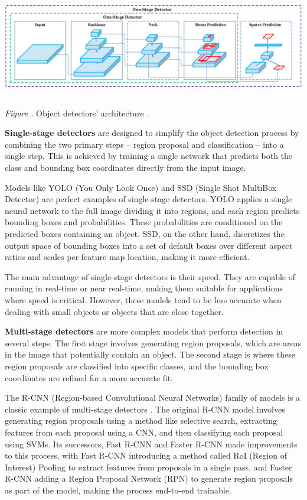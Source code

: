 \documentclass[14pt,a4paper]{extarticle}
\newcounter{e}
\newcounter{pic}
\newcommand{\pic}[1]{\refstepcounter{pic} \vspace{-0.3cm}\textit{Figure \arabic{pic}\label{#1}.}}
\newcounter{tabl}
\numberwithin{equation}{section}
\numberwithin{figure}{section}
\begin{document}
\begin{center}
    \includegraphics[height=4.5cm]{images/architecture.png}
\end{center}
\begin{center}
    \pic{yolov4-architecture} Object detectors' architecture \cite{yolov4-paper}.
\end{center}

\textbf{Single-stage detectors} are designed to simplify the object detection process by combining the two primary steps -- region proposal and classification -- into a single step. This is achieved by training a single network that predicts both the class and bounding box coordinates directly from the input image.

Models like YOLO (You Only Look Once) and SSD (Single Shot MultiBox Detector) \cite{ssd} are perfect examples of single-stage detectors. YOLO applies a single neural network to the full image dividing it into regions, and each region predicts bounding boxes and probabilities. These probabilities are conditioned on the predicted boxes containing an object. SSD, on the other hand, discretizes the output space of bounding boxes into a set of default boxes over different aspect ratios and scales per feature map location, making it more efficient.

The main advantage of single-stage detectors is their speed. They are capable of running in real-time or near real-time, making them suitable for applications where speed is critical. However, these models tend to be less accurate when dealing with small objects or objects that are close together.

\textbf{Multi-stage detectors} are more complex models that perform detection in several steps. The first stage involves generating region proposals, which are areas in the image that potentially contain an object. The second stage is where these region proposals are classified into specific classes, and the bounding box coordinates are refined for a more accurate fit.

The R-CNN (Region-based Convolutional Neural Networks) family of models is a classic example of multi-stage detectors \cite{r-cnn}. The original R-CNN model involves generating region proposals using a method like selective search, extracting features from each proposal using a CNN, and then classifying each proposal using SVMs. Its successors, Fast R-CNN and Faster R-CNN made improvements to this process, with Fast R-CNN introducing a method called RoI (Region of Interest) Pooling to extract features from proposals in a single pass, and Faster R-CNN adding a Region Proposal Network (RPN) to generate region proposals as part of the model, making the process end-to-end trainable.
\end{document}
